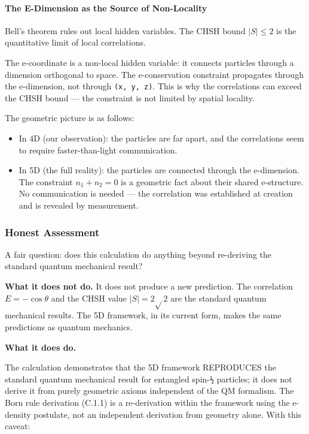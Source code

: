\documentclass[aps,prd,preprint,superscriptaddress,longbibliography,floatfix]{revtex4-2}
\theoremstyle{remark}
\begin{document}
\paragraph{The E-Dimension as the Source of Non-Locality}

Bell's theorem rules out local hidden variables. The CHSH bound $|S| \leq 2$ is the quantitative limit of local correlations.

The e-coordinate is a non-local hidden variable: it connects particles through a dimension orthogonal to space. The e-conservation constraint propagates through the e-dimension, not through \texttt{(x, y, z)}. This is why the correlations can exceed the CHSH bound --- the constraint is not limited by spatial locality.

The geometric picture is as follows:


\begin{itemize}
  \item In 4D (our observation): the particles are far apart, and the correlations seem to require faster-than-light communication.
  \item In 5D (the full reality): the particles are connected through the e-dimension. The constraint $n_{1} + n_{2} = 0$ is a geometric fact about their shared e-structure. No communication is needed --- the correlation was established at creation and is revealed by measurement.
\end{itemize}


\subsubsection{Honest Assessment}

A fair question: does this calculation do anything beyond re-deriving the standard quantum mechanical result?

\textbf{What it does not do.} It does not produce a new prediction. The correlation $E = -\cos \theta$ and the CHSH value $|S| = 2\sqrt{}2$ are the standard quantum mechanical results. The 5D framework, in its current form, makes the same predictions as quantum mechanics.

\textbf{What it does do.}

The calculation demonstrates that the 5D framework REPRODUCES the standard quantum mechanical result for entangled spin-\texttt{½} particles; it does not derive it from purely geometric axioms independent of the QM formalism. The Born rule derivation (C.1.1) is a re-derivation within the framework using the e-density postulate, not an independent derivation from geometry alone. With this caveat:
\end{document}
